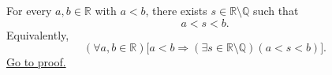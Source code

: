 \begin{theorem}
\label{thm:density-of-irrationals-in-reals}
For every $a,b\in\mathbb{R}$ with $a<b$, there exists
$s\in\mathbb{R}\setminus\mathbb{Q}$ such that
\[
  a<s<b.
\]
Equivalently,
\[
  (\forall a,b\in\mathbb{R})
  \bigl[a<b\Longrightarrow
  (\exists s\in\mathbb{R}\setminus\mathbb{Q})(a<s<b)\bigr].
\]
\hyperref[prf:density-of-irrationals-in-reals]{Go to proof.}
\end{theorem}